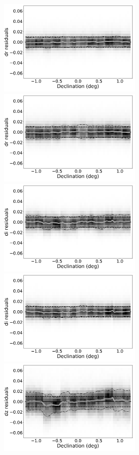 \documentclass[fleqn,usenatbib]{mnras}
\begin{document}
\begin{figure}
    \centering\includegraphics[width=7cm]{figures/colorResidDES42bright_dr_Dec_Hess.png}
    \centering\includegraphics[width=7cm]{figures/colorResidPSDR2v42bright_dr_Dec_Hess.png}
    \centering\includegraphics[width=7cm]{figures/colorResidDES42bright_di_Dec_Hess.png}
    \centering\includegraphics[width=7cm]{figures/colorResidPSDR2v42bright_di_Dec_Hess.png}
    \centering\includegraphics[width=7cm]{figures/colorResidDES42bright_dz_Dec_Hess.png}

\end{figure}
\end{document}
